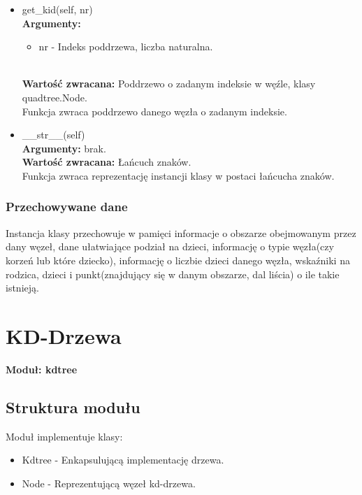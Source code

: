 \documentclass{article}
\begin{document}
\begin{itemize}
                    \item get\_kid(self, nr)\\
                        \textbf{Argumenty:} \begin{itemize}
                                \item nr - Indeks poddrzewa, liczba naturalna.
                            \end{itemize}\\
                        \textbf{Wartość zwracana:} Poddrzewo o zadanym indeksie w węźle, klasy quadtree.Node.\\
                        Funkcja zwraca poddrzewo danego węzła o zadanym indeksie.
                    
                    \item \_\_str\_\_(self)\\
                        \textbf{Argumenty:} brak.\\
                        \textbf{Wartość zwracana:} Łańcuch znaków. \\
                        Funkcja zwraca reprezentację instancji klasy w postaci łańcucha znaków. 
                    
                    
                \end{itemize}
            \subsubsection{Przechowywane dane}
                Instancja klasy przechowuje w pamięci informacje o obszarze obejmowanym przez dany węzeł, dane ułatwiające podział na dzieci, informację o typie węzła(czy korzeń lub które dziecko), informację o liczbie dzieci danego węzła, wskaźniki na rodzica, dzieci i punkt(znajdujący się w danym obszarze, dal liścia) o ile takie istnieją.
                
    \section{KD-Drzewa}
        \textbf{Moduł: kdtree}
        \subsection{Struktura modułu}
            Moduł implementuje klasy:
            \begin{itemize}
                \item Kdtree - Enkapsulującą implementację drzewa.
                \item Node - Reprezentującą węzeł kd-drzewa.
            \end{itemize}
\end{document}
